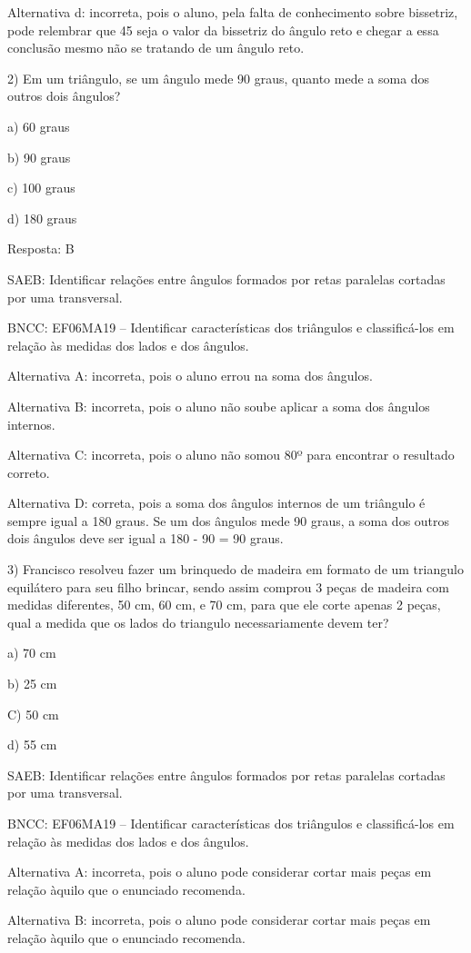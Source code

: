 Alternativa d: incorreta, pois o aluno, pela falta de conhecimento sobre
bissetriz, pode relembrar que 45 seja o valor da bissetriz do ângulo
reto e chegar a essa conclusão mesmo não se tratando de um ângulo reto.

2) Em um triângulo, se um ângulo mede 90 graus, quanto mede a soma dos
outros dois ângulos?

a) 60 graus

b) 90 graus

c) 100 graus

d) 180 graus

Resposta: B

SAEB: Identificar relações entre ângulos formados por retas paralelas
cortadas por uma transversal.

BNCC: EF06MA19 -- Identificar características dos triângulos e
classificá-los em relação às medidas dos lados e dos ângulos.

Alternativa A: incorreta, pois o aluno errou na soma dos ângulos.

Alternativa B: incorreta, pois o aluno não soube aplicar a soma dos
ângulos internos.

Alternativa C: incorreta, pois o aluno não somou 80º para encontrar o
resultado correto.

Alternativa D: correta, pois a soma dos ângulos internos de um triângulo
é sempre igual a 180 graus. Se um dos ângulos mede 90 graus, a soma dos
outros dois ângulos deve ser igual a 180 - 90 = 90 graus.

3) Francisco resolveu fazer um brinquedo de madeira em formato de um
triangulo equilátero para seu filho brincar, sendo assim comprou 3 peças
de madeira com medidas diferentes, 50 cm, 60 cm, e 70 cm, para que ele
corte apenas 2 peças, qual a medida que os lados do triangulo
necessariamente devem ter?

a) 70 cm

b) 25 cm

C) 50 cm

d) 55 cm

SAEB: Identificar relações entre ângulos formados por retas paralelas
cortadas por uma transversal.

BNCC: EF06MA19 -- Identificar características dos triângulos e
classificá-los em relação às medidas dos lados e dos ângulos.

Alternativa A: incorreta, pois o aluno pode considerar cortar mais peças
em relação àquilo que o enunciado recomenda.

Alternativa B: incorreta, pois o aluno pode considerar cortar mais peças
em relação àquilo que o enunciado recomenda.

